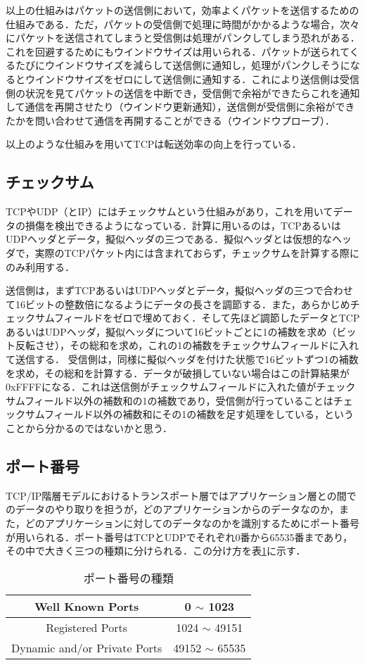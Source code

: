 以上の仕組みはパケットの送信側において，効率よくパケットを送信するための仕組みである．ただ，パケットの受信側で処理に時間がかかるような場合，次々にパケットを送信されてしまうと受信側は処理がパンクしてしまう恐れがある．これを回避するためにもウインドウサイズは用いられる．パケットが送られてくるたびにウインドウサイズを減らして送信側に通知し，処理がパンクしそうになるとウインドウサイズをゼロにして送信側に通知する．これにより送信側は受信側の状況を見てパケットの送信を中断でき，受信側で余裕ができたらこれを通知して通信を再開させたり（ウインドウ更新通知），送信側が受信側に余裕ができたかを問い合わせて通信を再開することができる（ウインドウプローブ）．

以上のような仕組みを用いてTCPは転送効率の向上を行っている．

\subsection{チェックサム}
TCPやUDP（とIP）にはチェックサムという仕組みがあり，これを用いてデータの損傷を検出できるようになっている．計算に用いるのは，TCPあるいはUDPヘッダとデータ，擬似ヘッダの三つである．擬似ヘッダとは仮想的なヘッダで，実際のTCPパケット内には含まれておらず，チェックサムを計算する際にのみ利用する．

送信側は，まずTCPあるいはUDPヘッダとデータ，擬似ヘッダの三つで合わせて16ビットの整数倍になるようにデータの長さを調節する．また，あらかじめチェックサムフィールドをゼロで埋めておく．そして先ほど調節したデータとTCPあるいはUDPヘッダ，擬似ヘッダについて16ビットごとに1の補数を求め（ビット反転させ），その総和を求め，これの1の補数をチェックサムフィールドに入れて送信する．
受信側は，同様に擬似ヘッダを付けた状態で16ビットずつ1の補数を求め，その総和を計算する．データが破損していない場合はこの計算結果が0xFFFFになる．これは送信側がチェックサムフィールドに入れた値がチェックサムフィールド以外の補数和の1の補数であり，受信側が行っていることはチェックサムフィールド以外の補数和にその1の補数を足す処理をしている，ということから分かるのではないかと思う．

\subsection{ポート番号}
TCP/IP階層モデルにおけるトランスポート層ではアプリケーション層との間でのデータのやり取りを担うが，どのアプリケーションからのデータなのか，また，どのアプリケーションに対してのデータなのかを識別するためにポート番号が用いられる．ポート番号はTCPとUDPでそれぞれ0番から65535番まであり，その中で大きく三つの種類に分けられる．この分け方を表\ref{tcpudp-kind-of-port}に示す．
\begin{table}[htb]
    \centering
    \caption{ポート番号の種類}
    \label{tcpudp-kind-of-port}
    \begin{tabular}{|c|c|} \hline
        Well Known Ports & 0 $\sim$ 1023 \\ \hline
        Registered Ports & 1024 $\sim$ 49151 \\ \hline
        Dynamic and/or Private Ports & 49152 $\sim$ 65535 \\ \hline
    \end{tabular}
\end{table}


